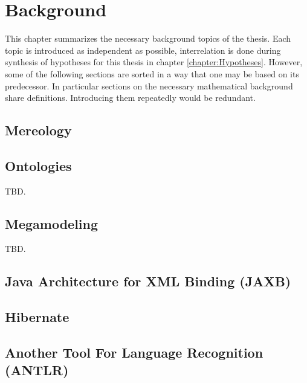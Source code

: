 \chapter{Background}
\label{chapter:Background}
This chapter summarizes the necessary background topics of the thesis.
Each topic is introduced as independent as possible, interrelation is done during synthesis of hypotheses for this thesis in chapter \ref{chapter:Hypotheses}.
However, some of the following sections are sorted in a way that one may be based on its predecessor.
In particular sections on the necessary mathematical background share definitions.
Introducing them repeatedly would be redundant.


%
%
\section{Mereology}



\section{Ontologies}
TBD.
\cite{DBLP:series/ihis/GuarinoOS09}

\section{Megamodeling}
TBD.
\cite{DBLP:conf/sattose/BaggeZ14}
\cite{DBLP:journals/entcs/FavreN05}

\subsection{\megal}
\cite{DBLP:conf/ecmdafa/LammelV14}
\cite{DBLP:conf/models/FavreLV12}
\cite{DBLP:conf/sle/Lammel16}

\subsection{\megalxtext}
\cite{LukasHaertelBScThesis}





\section{Java Architecture for XML Binding (JAXB)}

\section{Hibernate}

\section{Another Tool For Language Recognition (ANTLR)}
\cite{Parr:2013:DAR:2501720}

